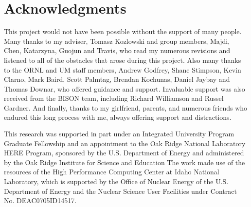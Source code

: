 \documentclass[edeposit,fullpage,11pt]{uiucthesis2009}
\begin{document}

\chapter*{Acknowledgments}

This project would not have been possible without the support of many people. 
Many thanks to my adviser, Tomasz Kozlowski and group members, Majdi, Chen, Katarzyna, Guojun and Travis, who read my numerous revisions and listened to all of the obstacles that arose during this project.
Also many thanks to the ORNL and UM staff members, Andrew Godfrey, Shane Stimpson, Kevin Clarno, Mark Baird, Scott Palmtag, Brendan Kochunas, Daniel Jaybay and Thomas Downar, who offered guidance and support.
Invaluable support was also received from the BISON team, including Richard Williamson and Russel Gardner.
And finally, thanks to my girlfriend, parents, and numerous friends who endured this long process with me, always offering support and distractions.

This research was supported in part under an Integrated University Program Graduate Fellowship and an appointment to the Oak Ridge National Laboratory HERE Program, sponsored by the U.S. Department of Energy and administered by the Oak Ridge Institute for Science and Education
The work made use of the resources of the High Performance Computing Center at Idaho National Laboratory, which is supported by the Office of Nuclear Energy of the U.S. Department of Energy and the Nuclear Science User Facilities under Contract No. DE­AC07­05ID14517.

\end{document}
